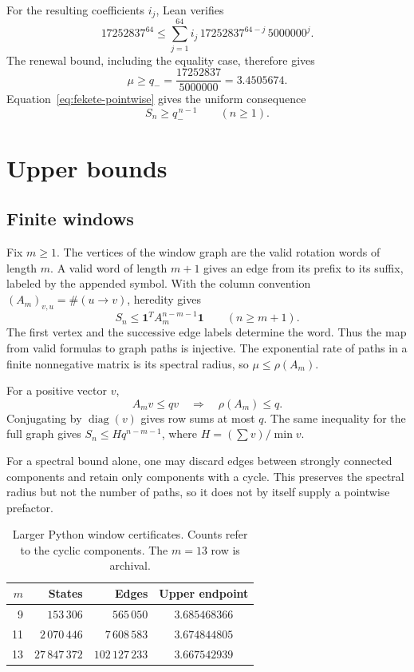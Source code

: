 \documentclass[conference]{IEEEtran}
\newcommand{\one}{\mathbf{1}}
\newcommand{\qminus}{q_-}
\begin{document}
For the resulting coefficients $i_j$, Lean verifies
\[
 17252837^{64}\leq
 \sum_{j=1}^{64}i_j\,17252837^{64-j}\,5000000^j.
\]
The renewal bound, including the equality case, therefore gives
\begin{equation}\label{eq:qminus}
 \mu\geq\qminus=\frac{17252837}{5000000}=3.4505674.
\end{equation}
Equation~\eqref{eq:fekete-pointwise} gives the uniform consequence
\begin{equation}\label{eq:closed-lower}
 S_n\geq\qminus^{\,n-1}\qquad(n\geq1).
\end{equation}

\section{Upper bounds}\label{sec:upper}

\subsection{Finite windows}

Fix $m\geq1$. The vertices of the window graph are the valid
rotation words of length $m$. A valid word of length $m+1$
gives an edge from its prefix to its suffix, labeled by the
appended symbol. With the column convention
$(A_m)_{v,u}=\#(u\to v)$, heredity gives
\begin{equation}\label{eq:upper-pointwise}
 S_n\leq\one^TA_m^{n-m-1}\one\qquad(n\geq m+1).
\end{equation}
The first vertex and the successive edge labels determine the word.
Thus the map from valid formulas to graph paths is injective.
The exponential rate of paths in a finite nonnegative matrix is
its spectral radius, so $\mu\leq\rho(A_m)$.

For a positive vector $v$,
\begin{equation}\label{eq:collatz}
 A_mv\leq qv\quad\Longrightarrow\quad\rho(A_m)\leq q.
\end{equation}
Conjugating by $\operatorname{diag}(v)$ gives row sums at most $q$.
The same inequality for the full graph gives
$S_n\leq Hq^{n-m-1}$, where $H=(\sum v)/\min v$.

For a spectral bound alone, one may discard edges between strongly
connected components and retain only components with a cycle.
This preserves the spectral radius but not the number of paths,
so it does not by itself supply a pointwise prefactor.

\begin{table}[t]
\caption{Larger Python window certificates. Counts refer to the
cyclic components. The $m=13$ row is archival.}
\label{tab:upper}
\centering
\begin{tabular}{r|r|r|c}
$m$ & States & Edges & Upper endpoint\\ \hline
9 & $153\,306$ & $565\,050$ & $3.685468366$\\
11 & $2\,070\,446$ & $7\,608\,583$ & $3.674844805$\\
13 & $27\,847\,372$ & $102\,127\,233$ & $3.667542939$
\end{tabular}
\end{table}
\end{document}
